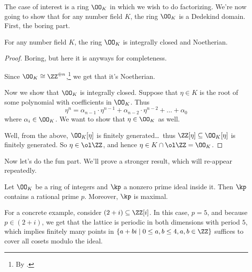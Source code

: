 The case of interest is a ring $\OO_K$ in which we wish to do factorizing.
We're now going to show that for any number field $K$, the ring $\OO_K$ is a Dedekind domain.
First, the boring part.
\begin{proposition}
	For any number field $K$, the ring $\OO_K$ is integrally closed and Noetherian.
\end{proposition}
\begin{proof}
	Boring, but here it is anyways for completeness.

	Since $\OO_K \cong \ZZ^{\oplus n}$,\footnote{By .}
	we get that it's Noetherian.

	Now we show that $\OO_K$ is integrally closed.
	Suppose that $\eta \in K$ is the root of some polynomial with coefficients in $\OO_K$.
	Thus
	\[ \eta^n = \alpha_{n-1} \cdot \eta^{n-1} + \alpha_{n-2} \cdot \eta^{n-2}
		+ \dots + \alpha_0 \]
	where $\alpha_i \in \OO_K$. We want to show that $\eta \in \OO_K$ as well.

	Well, from the above, $\OO_K[\eta]$ is finitely generated\dots\
	thus $\ZZ[\eta] \subseteq \OO_K[\eta]$ is finitely generated.
	So $\eta \in \ol\ZZ$, and hence $\eta \in K \cap \ol\ZZ = \OO_K$.
\end{proof}
Now let's do the fun part.
We'll prove a stronger result, which will re-appear repeatedly.
\begin{theorem}
	\label{thm:prime_ideals_over_rational}
	Let $\OO_K$ be a ring of integers
	and $\kp$ a nonzero prime ideal inside it.
	Then $\kp$ contains a rational prime $p$.
	Moreover, $\kp$ is maximal.
\end{theorem}
For a concrete example, consider $(2+i) \subseteq \ZZ[i]$. In this case, $p = 5$,
and because $p \in (2+i)$, we get that the lattice is periodic in both dimensions
with period $5$, which implies finitely many points in $\{a+bi \mid 0 \le a, b \le 4, a, b \in \ZZ\}$
suffices to cover all cosets modulo the ideal.

